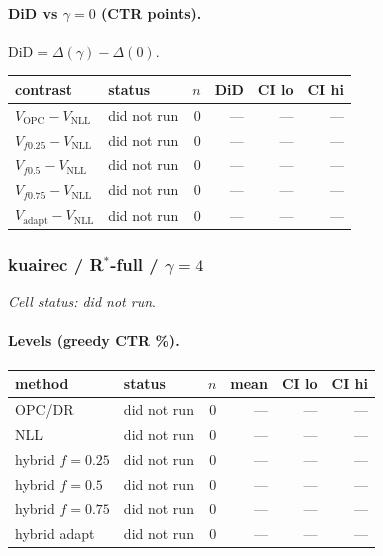 \documentclass[10pt,a4paper]{article}
\begin{document}
\paragraph{DiD vs $\gamma=0$ (CTR points).} $\mathrm{DiD}=\Delta(\gamma)-\Delta(0)$.
{\centering\small\begin{tabular}{llrrrr}
\toprule contrast & status & $n$ & DiD & CI lo & CI hi \\
\midrule
$V_{\mathrm{OPC}}-V_{\mathrm{NLL}}$ & did not run & 0 & --- & --- & --- \\
$V_{f0.25}-V_{\mathrm{NLL}}$ & did not run & 0 & --- & --- & --- \\
$V_{f0.5}-V_{\mathrm{NLL}}$ & did not run & 0 & --- & --- & --- \\
$V_{f0.75}-V_{\mathrm{NLL}}$ & did not run & 0 & --- & --- & --- \\
$V_{\mathrm{adapt}}-V_{\mathrm{NLL}}$ & did not run & 0 & --- & --- & --- \\
\bottomrule\end{tabular}\par}
\bigskip
\subsubsection{kuairec / R$^*$-full / $\gamma=4$}
\emph{Cell status: did not run}.
\paragraph{Levels (greedy CTR \%).}
{\centering\small\begin{tabular}{llrrrr}
\toprule method & status & $n$ & mean & CI lo & CI hi \\
\midrule
OPC/DR & did not run & 0 & --- & --- & --- \\
NLL & did not run & 0 & --- & --- & --- \\
hybrid $f{=}0.25$ & did not run & 0 & --- & --- & --- \\
hybrid $f{=}0.5$ & did not run & 0 & --- & --- & --- \\
hybrid $f{=}0.75$ & did not run & 0 & --- & --- & --- \\
hybrid adapt & did not run & 0 & --- & --- & --- \\
\bottomrule\end{tabular}\par}
\end{document}
